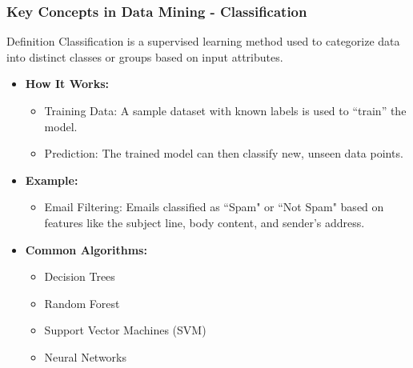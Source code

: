 \documentclass[aspectratio=169]{beamer}
\begin{document}
\begin{frame}[fragile]
    \frametitle{Key Concepts in Data Mining - Classification}
    \begin{block}{Definition}
        Classification is a supervised learning method used to categorize data into distinct classes or groups based on input attributes.
    \end{block}
    \begin{itemize}
        \item \textbf{How It Works:}
        \begin{itemize}
            \item Training Data: A sample dataset with known labels is used to ``train'' the model.
            \item Prediction: The trained model can then classify new, unseen data points.
        \end{itemize}
        \item \textbf{Example:}
        \begin{itemize}
            \item Email Filtering: Emails classified as ``Spam" or ``Not Spam" based on features like the subject line, body content, and sender's address.
        \end{itemize}
        \item \textbf{Common Algorithms:}
        \begin{itemize}
            \item Decision Trees
            \item Random Forest
            \item Support Vector Machines (SVM)
            \item Neural Networks
        \end{itemize}
    \end{itemize}
\end{frame}
\end{document}
